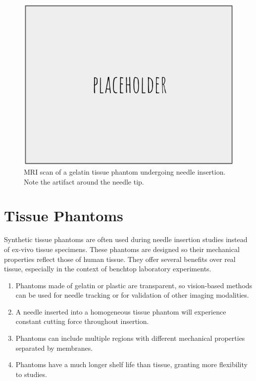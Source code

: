 \begin{figure}[h]
\includegraphics[width=1.0\textwidth]{Fig/placeholder.png}
\caption{MRI scan of a gelatin tissue phantom undergoing needle insertion. Note the artifact around the needle tip.}
\label{fig:mri_phantom}
\end{figure}


\section{Tissue Phantoms}
Synthetic tissue phantoms are often used during needle insertion studies instead of ex-vivo tissue specimens. These phantoms are designed so their mechanical properties reflect those of human tissue. They offer several benefits over real tissue, especially in the context of benchtop laboratory experiments.
\begin{enumerate}
\item Phantoms made of gelatin or plastic are transparent, so vision-based methods can be used for needle tracking or for validation of other imaging modalities.

\item A needle inserted into a homogeneous tissue phantom will experience constant cutting force throughout insertion.

\item Phantoms can include multiple regions with different mechanical properties separated by membranes.

\item Phantoms have a much longer shelf life than tissue, granting more flexibility to studies.
\end{enumerate}


